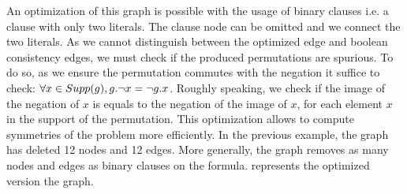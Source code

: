 %
%
%
%


An optimization of this graph is possible with the usage of binary clauses i.e. a clause with only two literals.
The clause node can be omitted and we connect the two literals. As we cannot distinguish between the optimized edge 
and boolean consistency edges, we must check if the produced permutations are spurious. 
To do so, as we ensure the permutation commutes with the negation it suffice to check:
$\forall x \in Supp(g), g.\neg x = \neg g.x$.
Roughly speaking, we check if the image of the negation of $x$ is equals to the negation of the image of $x$, for each element $x$ in the support of the permutation.
This optimization allows to compute symmetries of the problem more efficiently.
In the previous example, the graph has deleted 12 nodes and 12 edges. More generally,
the graph removes as many nodes and edges as binary clauses on the formula.
 represents the optimized version the graph.

